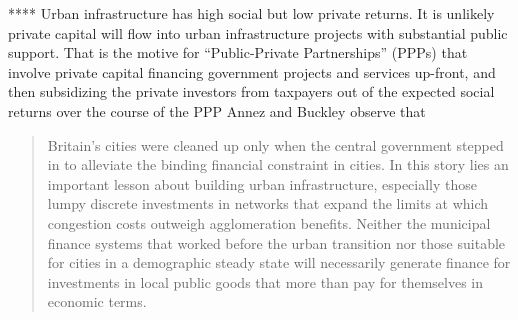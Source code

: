 ****  Urban infrastructure has high social but low private returns. It is unlikely private capital will flow into urban infrastructure projects with substantial public support. That is the motive for ``\gls{Public-Private Partnerships}'' (PPPs) that involve private capital financing government projects and services up-front, and then subsidizing the private investors  from taxpayers out of the expected social returns over the course of the PPP
Annez and Buckley\cite{annezUrbanizationGrowthSetting2009} observe that 
\begin{quotation}
Britain’s cities were cleaned up only when the central government stepped in to alleviate the binding financial constraint in cities. In this story lies an important lesson about building urban infrastructure, especially those lumpy discrete investments in networks that expand the limits at which congestion costs outweigh agglomeration benefits. Neither the municipal finance systems that worked before the urban transition nor those suitable for cities in a demographic steady state will necessarily generate finance for investments in local public goods that more than pay for themselves in economic terms. 
\end{quotation}









